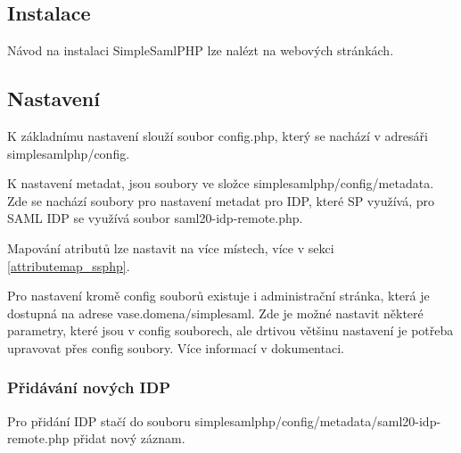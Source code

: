 \subsection{Instalace}
Návod na instalaci SimpleSamlPHP lze nalézt na webových stránkách.\cite{SimpleSAMLphp-instalation-and-configurationduid}

\subsection{Nastavení} %
K základnímu nastavení slouží soubor config.php, který se nachází v adresáři simplesamlphp/config.

K nastavení metadat, jsou soubory ve složce simplesamlphp/config/metadata. Zde se nachází soubory pro nastavení metadat pro IDP, které SP využívá, pro SAML IDP se využívá soubor saml20-idp-remote.php.

Mapování atributů lze nastavit na více místech, více v sekci \ref{attributemap_ssphp}.

Pro nastavení kromě config souborů existuje i administrační stránka, která je dostupná na adrese vase.domena/simplesaml. Zde je možné nastavit některé parametry, které jsou v config souborech, ale drtivou většinu nastavení je potřeba upravovat přes config soubory.
Více informací v dokumentaci. \cite{simplesamlphpdoc}

\subsubsection{Přidávání nových IDP} %

Pro přidání IDP stačí do souboru simplesamlphp/config/metadata/saml20-idp-remote.php přidat nový záznam.

